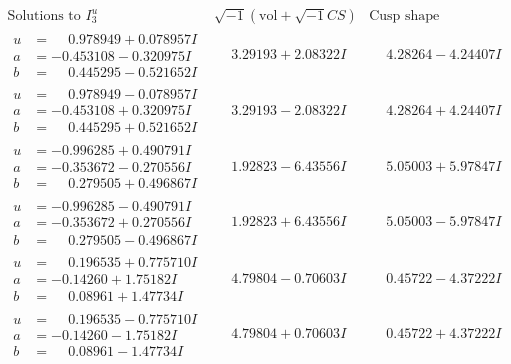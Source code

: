 \documentclass[1p]{elsarticle_modified}
\theoremstyle{definition}
\newcommand{\I}{\sqrt{-1}}
\begin{document}
$$\begin{array}{c|c|c}  
\text{Solutions to }I^u_{3}& \I (\text{vol} + \sqrt{-1}CS) & \text{Cusp shape}\\
 \hline 
\begin{aligned}
u &= \phantom{-}0.978949 + 0.078957 I \\
a &= -0.453108 - 0.320975 I \\
b &= \phantom{-}0.445295 - 0.521652 I\end{aligned}
 & \phantom{-}3.29193 + 2.08322 I & \phantom{-}4.28264 - 4.24407 I \\ \hline\begin{aligned}
u &= \phantom{-}0.978949 - 0.078957 I \\
a &= -0.453108 + 0.320975 I \\
b &= \phantom{-}0.445295 + 0.521652 I\end{aligned}
 & \phantom{-}3.29193 - 2.08322 I & \phantom{-}4.28264 + 4.24407 I \\ \hline\begin{aligned}
u &= -0.996285 + 0.490791 I \\
a &= -0.353672 - 0.270556 I \\
b &= \phantom{-}0.279505 + 0.496867 I\end{aligned}
 & \phantom{-}1.92823 - 6.43556 I & \phantom{-}5.05003 + 5.97847 I \\ \hline\begin{aligned}
u &= -0.996285 - 0.490791 I \\
a &= -0.353672 + 0.270556 I \\
b &= \phantom{-}0.279505 - 0.496867 I\end{aligned}
 & \phantom{-}1.92823 + 6.43556 I & \phantom{-}5.05003 - 5.97847 I \\ \hline\begin{aligned}
u &= \phantom{-}0.196535 + 0.775710 I \\
a &= -0.14260 + 1.75182 I \\
b &= \phantom{-}0.08961 + 1.47734 I\end{aligned}
 & \phantom{-}4.79804 - 0.70603 I & \phantom{-}0.45722 - 4.37222 I \\ \hline\begin{aligned}
u &= \phantom{-}0.196535 - 0.775710 I \\
a &= -0.14260 - 1.75182 I \\
b &= \phantom{-}0.08961 - 1.47734 I\end{aligned}
 & \phantom{-}4.79804 + 0.70603 I & \phantom{-}0.45722 + 4.37222 I \\ \hline\begin{aligned}

\end{aligned}
\end{array}$$
\end{document}
